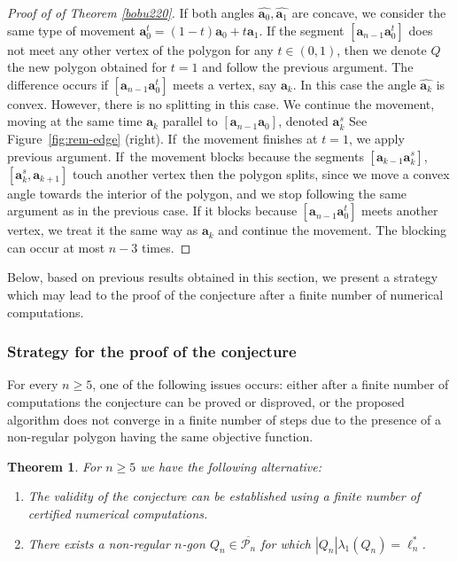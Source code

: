 \documentclass[11pt]{article}
\numberwithin{equation}{section}\newtheorem*{jepEnonce}{\jepEnonceTitle}\newenvironment{enonce*}[1]{\def\jepEnonceTitle{#1}\jepEnonce}{\endjepEnonce}\newtheorem*{conj*}{Conjecture}
\newenvironment{enumeratea}
{\bgroup\def\theenumi{\alph{enumi}}\begin{enumerate}}
{\end{enumerate}\egroup}
\theoremstyle{plain}
\newtheorem{thm}{Theorem}[section]
\theoremstyle{definition}
\newcommand{\bo}[1]{{\boldsymbol#1}}
\begin{document}
\begin{proof}[Proof of of Theorem \ref{bobu220}]
If both angles $\widehat{\bo a_0}, \widehat{\bo a_1}$ are concave, we consider the same type of movement $\bo a_0^t= (1-t) \bo a_0+t\bo a_1$. If the segment $[\bo a_{n-1}\bo a_0^t]$ does not meet any other vertex of the polygon for any $t\in(0,1)$, then we denote $Q$ the new polygon obtained for $t=1$ and follow the previous argument. The difference occurs if $[\bo a_{n-1}\bo a_0^t]$ meets a vertex, say $\bo a_k$. In this case the angle $\widehat{\bo a_k}$ is convex. However, there is no splitting in this case. We continue the movement, moving at the same time $\bo a_k$ {parallel to $[\bo a_{n-1}\bo a_0]$, denoted $\bo a_k^s$ See Figure~\ref{fig:rem-edge} (right)}.
If~the movement finishes at $t=1$, we apply previous argument. If~the movement blocks because the {segments $[\bo a_{k-1}\bo a_k^s]$, $[\bo a_k^s, \bo a_{k+1}]$ touch another vertex} then the polygon {splits, since we move a convex angle towards the interior of the polygon, and we stop following the same argument as in the previous case}. If it blocks because $[\bo a_{n-1}\bo a_0^t]$ meets another vertex, we treat it the same way as $\bo a_k$ and continue the movement. The blocking can occur at most $n-3$ times.
\end{proof}

Below, based on previous results obtained in this section, we present a strategy which may lead to the proof of the conjecture after a finite number of numerical computations.

\subsubsection*{Strategy for the proof of the conjecture}
For every $n \ge 5$, one of the following issues occurs: either after a finite number of computations the conjecture can be proved or disproved, or the proposed algorithm does not converge in a finite number of steps due to the presence of a non-regular polygon having the same objective function.

\begin{thm}\label{thm:numerical-proof}
For $n \geq 5$ we have the following alternative:
\begin{enumeratea}
\item\label{thm:numerical-proofa}
The validity of the conjecture can be established using a finite number of certified numerical computations.

\item\label{thm:numerical-proofb}
There exists a non-regular $n$-gon $Q_n \in \overline{\mathcal P_n}$ for which $|Q_n|\lambda_1(Q_n) = \ell_n^*$.
\end{enumeratea}
\end{thm}
\end{document}
